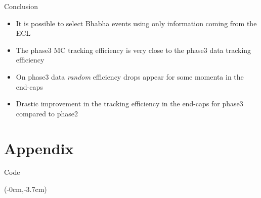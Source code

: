 \documentclass[8pt]{beamer}
\begin{document}
\begin{frame}{Conclusion}
	
	
	\begin{itemize}
		\item It is possible to select Bhabha events using only information coming from the ECL
		\item The phase3 MC tracking efficiency is very close to the phase3 data tracking efficiency
		
		\item On phase3 data \textit{random} efficiency drops appear for some momenta in the end-caps 
		\item Drastic improvement in the tracking efficiency in the end-caps for phase3 compared to phase2
	\end{itemize}
	
	
	
	
\end{frame}



\appendix
\section{Appendix}
\begin{frame}{Code}


\lstset{language=Python}
\lstset{basicstyle=\normalsize}

\begin{textblock*}{\textwidth}(-0cm,-3.7cm)
	
	
	
	
\end{textblock*}


\end{frame}
\end{document}
